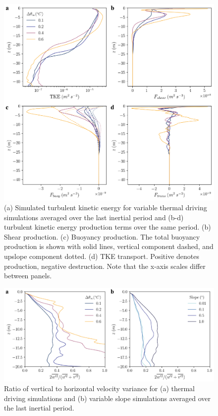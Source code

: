 \documentclass[tc, manuscript]{copernicus}
\begin{document}
\begin{figure}[t]
\includegraphics[width=12cm]{figS2.pdf}
\caption{(a) Simulated turbulent kinetic energy for variable thermal driving simulations averaged over the last inertial period and (b-d) turbulent kinetic energy production terms over the same period. (b) Shear production. (c) Buoyancy production. The total buoyancy production is shown with solid lines, vertical component dashed, and upslope component dotted. (d) TKE transport. Positive denotes production, negative destruction. Note that the x-axis scales differ between panels.}
\label{fig:tke_budget_1}
\end{figure}

\begin{figure}[t]
\includegraphics[width=12cm]{figS3.pdf}
\caption{Ratio of vertical to horizontal velocity variance for (a) thermal driving simulations and (b) variable slope simulations averaged over the last inertial period.}
\label{fig:vel_var_ratio}
\end{figure}
\end{document}
